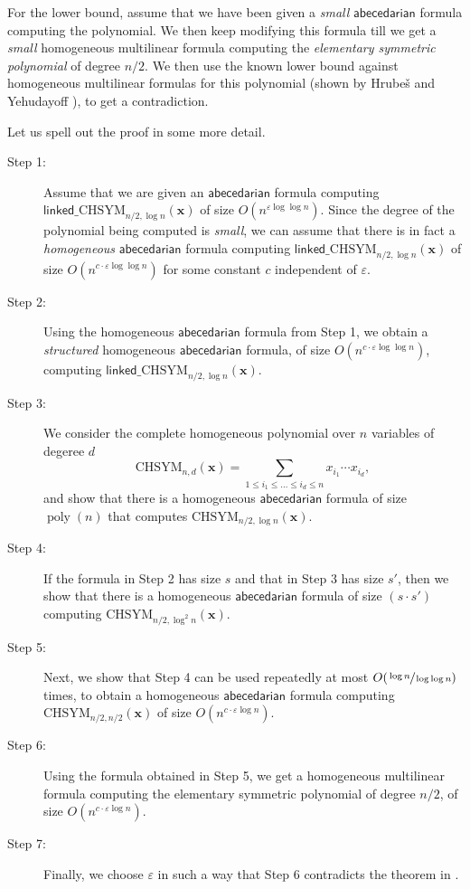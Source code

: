 \documentclass[10pt,a4paper]{article}
\def\Hrubes{Hrube{\v{s}}}
\def\poly{\operatorname{poly}}
\def\vecx{\mathbf{x}}
\renewcommand{\epsilon}{\varepsilon}
\newcommand{\abcd}{\mathsf{abecedarian}}
\newcommand{\chsym}[2]{\mathrm{CHSYM}_{#1,#2}}
\newcommand{\lchsym}[2]{\mathrm{\mathsf{linked}\_CHSYM}_{#1,#2}}
\begin{document}
\vspace{1em}
\noindent For the lower bound, assume that we have been given a \emph{small} $\abcd$ formula computing the polynomial.
We then keep modifying this formula till we get a \emph{small} homogeneous multilinear formula computing the \emph{elementary symmetric polynomial} of degree $n/2$. 
We then use the known lower bound against homogeneous multilinear formulas for this polynomial (shown by {\Hrubes} and Yehudayoff \cite{HY11}), to get a contradiction.

Let us spell out the proof in some more detail.

\begin{description}
	\item[Step 1:] Assume that we are given an $\abcd$ formula  computing $\lchsym{n/2}{\log n}(\vecx)$ of size $O(n^{\epsilon \log \log n})$.
	Since the degree of the polynomial being computed is \emph{small}, we can assume that there is in fact a \emph{homogeneous} $\abcd$ formula computing $\lchsym{n/2}{\log n}(\vecx)$ of size $O(n^{c \cdot \epsilon \log \log n})$ for some constant $c$ independent of $\epsilon$.
	\item[Step 2:] Using the homogeneous $\abcd$ formula from Step 1, we obtain a \emph{structured} homogeneous $\abcd$ formula, of size $O(n^{c \cdot \epsilon \log \log n})$, computing $\lchsym{n/2}{\log n}(\vecx)$.
	\item[Step 3:] We consider the complete homogeneous polynomial over $n$ variables of degeree $d$ 
	\[
		\chsym{n}{d} (\vecx) = \sum_{1 \leq i_1 \leq \ldots \leq i_d \leq n} x_{i_1} \cdots x_{i_d},
	\]
	and show that there is a homogeneous $\abcd$ formula of size $\poly(n)$ that computes $\chsym{n/2}{\log n} (\vecx)$.
	\item[Step 4:] If the formula in Step 2 has size $s$ and that in Step 3 has size $s'$, then we show that there is a homogeneous $\abcd$ formula of size $(s \cdot s')$ computing $\chsym{n/2}{\log^2 n} (\vecx)$.
	\item[Step 5:] Next, we show that Step 4 can be used repeatedly at most $O(\sfrac{\log n}{\log \log n})$ times, to obtain a homogeneous $\abcd$ formula computing $\chsym{n/2}{n/2} (\vecx)$ of size $O(n^{c \cdot \epsilon \log n})$.
	\item[Step 6:] Using the formula obtained in Step 5, we get a homogeneous multilinear formula computing the elementary symmetric polynomial of degree $n/2$, of size $O(n^{c \cdot \epsilon \log n})$.
	\item[Step 7:] Finally, we choose $\epsilon$ in such a way that Step 6 contradicts the theorem in \cite{HY11}. 
\end{description}
\end{document}
